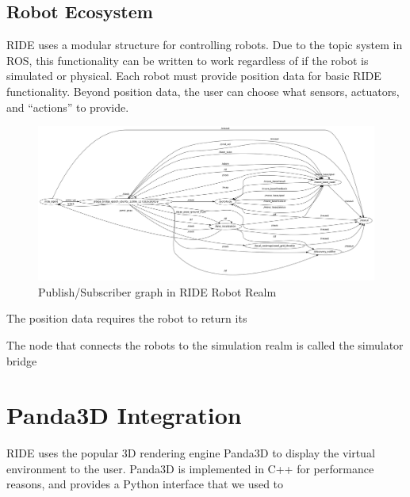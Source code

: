 \subsection{Robot Ecosystem}

RIDE uses a modular structure for controlling robots. Due to the topic system in ROS, this functionality can be written to work regardless of if the robot is simulated or physical. Each robot must provide position data for basic RIDE functionality. Beyond position data, the user can choose what sensors, actuators, and ``actions'' to provide.


\begin{figure}[ht]
\includegraphics[width=\textwidth]{images/ride-robot-realm.png}
\caption{Publish/Subscriber graph in RIDE Robot Realm}
\end{figure}

The position data requires the robot to return its

The node that connects the robots to the simulation realm is called the simulator bridge

\section{Panda3D Integration}

RIDE uses the popular 3D rendering engine Panda3D to display the virtual environment to the user. Panda3D is implemented in C++ for performance reasons, and provides a Python interface that we used to